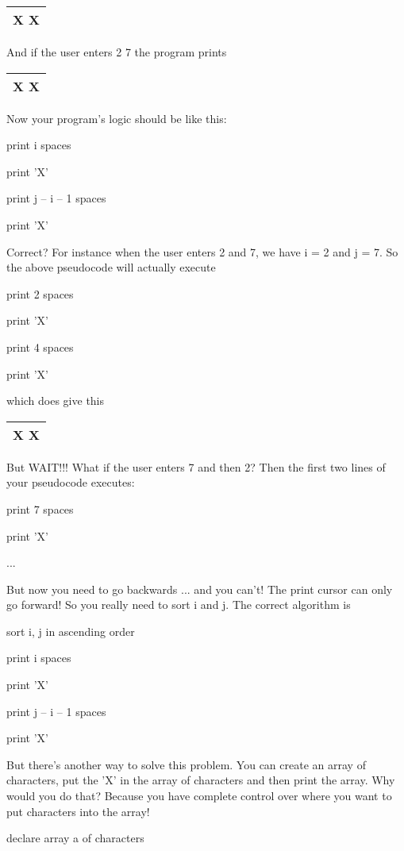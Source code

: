 \documentclass[
]{article}
\begin{document}
\begin{longtable}[]{@{}l@{}}
\toprule
\endhead
X X\tabularnewline
\bottomrule
\end{longtable}

And if the user enters 2 7 the program prints

\begin{longtable}[]{@{}l@{}}
\toprule
\endhead
X X\tabularnewline
\bottomrule
\end{longtable}

Now your program's logic should be like this:

print i spaces

print 'X'

print j -- i -- 1 spaces

print 'X'

Correct? For instance when the user enters 2 and 7, we have i = 2 and j
= 7. So the above pseudocode will actually execute

print 2 spaces

print 'X'

print 4 spaces

print 'X'

which does give this

\begin{longtable}[]{@{}l@{}}
\toprule
\endhead
X X\tabularnewline
\bottomrule
\end{longtable}

But WAIT!!! What if the user enters 7 and then 2? Then the first two
lines of your pseudocode executes:

print 7 spaces

print 'X'

...

But now you need to go backwards ... and you can't! The print cursor can
only go forward! So you really need to sort i and j. The correct
algorithm is

sort i, j in ascending order

print i spaces

print 'X'

print j -- i -- 1 spaces

print 'X'

But there's another way to solve this problem. You can create an array
of characters, put the 'X' in the array of characters and then print the
array. Why would you do that? Because you have complete control over
where you want to put characters into the array!

declare array a of characters
\end{document}
